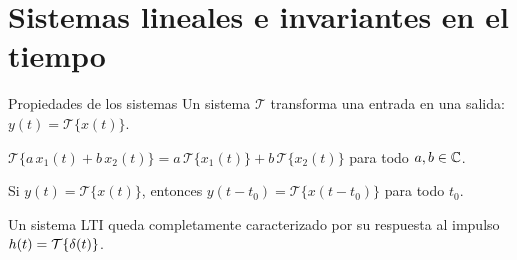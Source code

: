 \section{Sistemas lineales e invariantes en el tiempo}

\begin{frame}{Propiedades de los sistemas}
  Un sistema $\mathcal{T}$ transforma una entrada en una salida: $y(t) = \mathcal{T}\{x(t)\}$.

  \begin{definicion}[linealidad]
    $\mathcal{T}\{a\,x_1(t) + b\,x_2(t)\} = a\,\mathcal{T}\{x_1(t)\} + b\,\mathcal{T}\{x_2(t)\}$
    para todo $a, b \in \mathbb{C}$.
  \end{definicion}

  \begin{definicion}
    Si $y(t) = \mathcal{T}\{x(t)\}$, entonces $y(t - t_0) = \mathcal{T}\{x(t - t_0)\}$ para todo $t_0$.
  \end{definicion}

  \begin{importante}
    Un sistema LTI queda completamente caracterizado por su
    \alert{respuesta al impulso} $h(t) = \mathcal{T}\{\delta(t)\}$.
  \end{importante}
\end{frame}

